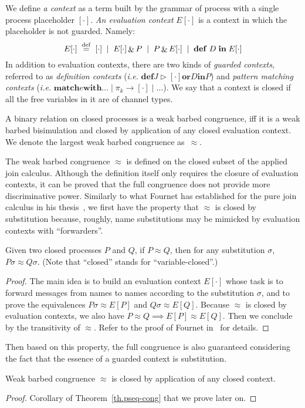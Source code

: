 \documentclass{LMCS}
\makeatletter
\newcommand{\forget}[1]{}
\renewcommand{\exp}{e}
\newcommand{\ie}{\emph{i.e.}\@\xspace}
\newcommand{\kwd}[1]{\ensuremath{\mathbf{#1}}}
\newcommand{\prefix}[1]{\mathopen{}\mathrel{\kwd {#1}}}
\newcommand{\infix}[1]{\mathrel{\kwd {#1}}}
\renewcommand{\_}{\mathord{\rule[-.25ex]{1ex}{.15ex}}}
\newcommand{\defineas}{\;\stackrel{\mathrm{def}}=\;}
\newcommand{\para}[2]{#1\mathop{\&}#2}
\newcommand{\dis}[2]{#1\infix{or}#2}
\newcommand{\define}[2]{\prefix{def} #1 \infix{in} #2}
\newcommand{\reaction}[2]{#1 \triangleright #2}
\newcommand{\sub}[2]{#1#2}
\newcommand{\wbc}{\mathrel{\approx}}
\newcommand{\econtext}[1]{E[#1]}
\newcommand{\mctxt}[1]{\prefix{match} \exp \infix{with} \ldots \mid \pi_k
  \rightarrow #1 \mid \ldots}
\newcommand{\jctxt}[2][R]{\define{\dis{\reaction{J}{#2}}{D}}{#1}}
\makeatother
\begin{document}
We define \emph{a context} as a term built by the grammar of process
with a single process placeholder $[\cdot]$.  \emph{An evaluation
  context} $\econtext{\cdot}$ is a context in which the placeholder is
not guarded. Namely: $$
\econtext{\cdot} \defineas [\cdot] \;\mid\;
\para{\econtext{\cdot}}{P} \;\mid\; \para{P}{\econtext{\cdot}}
\;\mid\; \define{D}{\econtext{\cdot}}\\
$$
In addition to evaluation contexts,
there are two kinds of \emph{guarded contexts},
referred to as \emph{definition contexts} (\ie
$\jctxt[P]{[\cdot]}$) and \emph{pattern matching contexts} (\ie
$\mctxt{[\cdot]}$).
We say that a context is closed if all the free variables in it are of
channel types.
\begin{defi}
  A binary relation on closed processes is a weak barbed congruence, iff
  it is a weak barbed bisimulation and closed by application of any
  closed evaluation context. We denote the largest weak barbed
  congruence as~$\wbc$.
\end{defi}
The weak barbed congruence $\wbc$ is defined on the closed subset of
the applied join calculus. Although the definition itself only
requires the closure of evaluation contexts, it can be proved that the
full congruence does not provide more discriminative power. Similarly
to what Fournet has established for the pure join calculus in his
thesis~\cite{Fournet98:PhD}, we first have the property that $\wbc$ is
closed by substitution because, roughly, name substitutions may be
mimicked by evaluation contexts with ``forwarders''.
\begin{lem}\label{lemma.wbcsub}
  Given two closed processes $P$ and $Q$, if $P \wbc Q$, then for any
  substitution $\sigma$, $\sub{P}{\sigma}\wbc\sub{Q}{\sigma}$.
 (Note that ``closed'' stands for ``variable-closed''.)
\end{lem}
\begin{proof}
  The main idea is to build an evaluation context $\econtext{\cdot}$
  whose task is to forward messages from names to names
  according to the substitution $\sigma$, and to prove the
  equivalences $P\sigma \wbc \econtext{P}$ and $Q\sigma \wbc
  \econtext{Q}$. Because $\wbc$ is closed by evaluation contexts, we
  also have $P\wbc Q \implies \econtext{P}\wbc\econtext{Q}$. Then we
  conclude by the transitivity of $\wbc$. 
  Refer to the proof of Fournet in~\cite[Lemma 4.14 of Chapter
  4]{Fournet98:PhD} for details. \forget{\qed}
\end{proof}
Then based on this property, the full congruence is also
guaranteed considering the fact that the essence of a guarded
  context is substitution.
\begin{thm}\label{th.wbcfull}
  Weak barbed congruence $\wbc$ is closed by application of any
  closed context.
\end{thm}
\begin{proof}
  Corollary of
  Theorem~\ref{th.pseq-cong} that we prove later on. \forget{\qed}
\end{proof}
\end{document}
